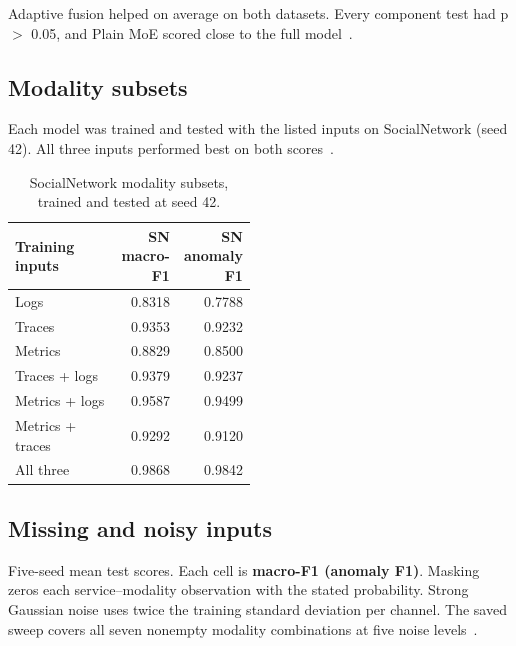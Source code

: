 \documentclass[11pt,a4paper,onecolumn]{IEEEtran}
\begin{document}
Adaptive fusion helped on average on both datasets. Every component test had p \ensuremath{>} 0.05, and
Plain MoE scored close to the full model~\cite{experiment-results}.

\subsection{Modality subsets}

Each model was trained and tested with the listed inputs on SocialNetwork (seed 42). All three inputs
performed best on both scores~\cite{experiment-results}.

\begin{table}[H]
\centering
\small
\setlength{\tabcolsep}{4pt}
\renewcommand{\arraystretch}{1.18}
\caption{SocialNetwork modality subsets, trained and tested at seed 42.}
\begin{tabular}{@{}P{0.48\linewidth}rr@{}}
\toprule
\textbf{Training inputs} & \textbf{SN macro-F1} & \textbf{SN anomaly F1} \\
\midrule
Logs &
  0.8318 &
  0.7788 \\
Traces &
  0.9353 &
  0.9232 \\
Metrics &
  0.8829 &
  0.8500 \\
Traces + logs &
  0.9379 &
  0.9237 \\
Metrics + logs &
  0.9587 &
  0.9499 \\
Metrics + traces &
  0.9292 &
  0.9120 \\
All three &
  0.9868 &
  0.9842 \\
\bottomrule
\end{tabular}
\end{table}

\subsection{Missing and noisy inputs}

Five-seed mean test scores. Each cell is \textbf{macro-F1 (anomaly F1)}. Masking zeros each
service--modality observation with the stated probability. Strong Gaussian noise uses twice the training
standard deviation per channel. The saved sweep covers all seven nonempty modality combinations at five
noise levels~\cite{experiment-results}.
\end{document}
